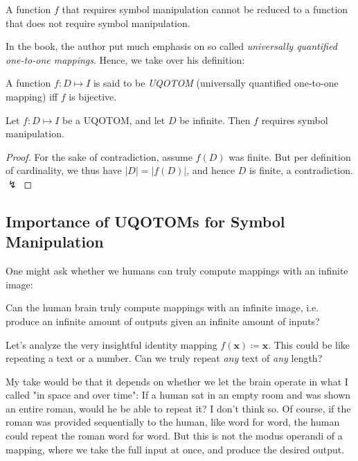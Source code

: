 \documentclass[../../main.tex]{subfiles}
\begin{document}
    \begin{corollary}
        A function $f$ that requires symbol manipulation cannot be reduced to a function that does not require symbol manipulation.
    \end{corollary}

    In the book, the author put much emphasis on so called \emph{universally quantified one-to-one mappings}. Hence, we take over his definition:

    \begin{definition}
        A function $f: D \mapsto I$ is said to be \emph{UQOTOM} (universally quantified one-to-one mapping) iff $f$ is bijective.
    \end{definition}

    \begin{proposition}
        Let $f: D \mapsto I$ be a UQOTOM, and let $D$ be infinite. Then $f$ requires symbol manipulation.
    \end{proposition}
    \vspace{-2.5em}
    \begin{proof}
        For the sake of contradiction, assume $f(D)$ was finite. But per definition of cardinality, we thus have $|D| = |f(D)|$, and hence $D$ is finite, a contradiction. $\lightning$
    \end{proof}

    \subsection{Importance of UQOTOMs for Symbol Manipulation}
    One might ask whether we humans can truly compute mappings with an infinite image:

    \begin{disputation}
        Can the human brain truly compute mappings with an infinite image, i.e. produce an infinite amount of outputs given an infinite amount of inputs?
    \end{disputation}

    Let's analyze the very insightful identity mapping $f(\bm{x}) \coloneqq \bm{x}$. This could be like repeating a text or a number. Can we truly repeat \emph{any} text of \emph{any} length?
    
    My take would be that it depends on whether we let the brain operate in what I called "in space and over time": If a  human sat in an empty room and was shown an entire roman, would he be able to repeat it? I don't think so. Of course, if the roman was provided sequentially to the human, like word for word, the human could repeat the roman word for word. But this is not the modus operandi of a mapping, where we take the full input at once, and produce the desired output.
\end{document}
